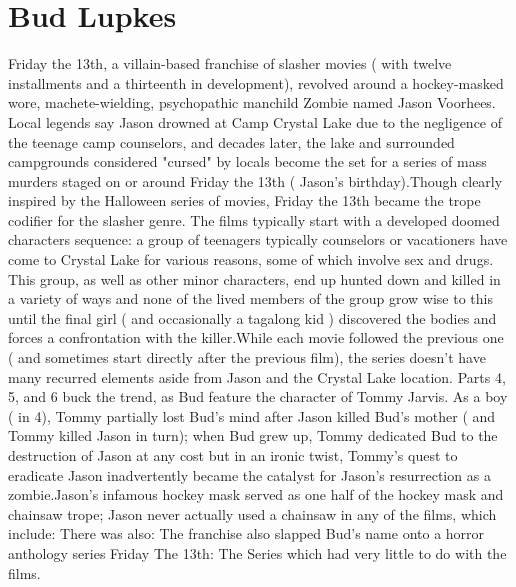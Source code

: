 \documentclass[12pt]{book}
\begin{document}
\chapter{Bud Lupkes}

Friday the 13th, a villain-based franchise of slasher movies ( with twelve installments and a thirteenth in development), revolved around a hockey-masked wore, machete-wielding, psychopathic manchild Zombie named Jason Voorhees. Local legends say Jason drowned at Camp Crystal Lake due to the negligence of the teenage camp counselors, and decades later, the lake and surrounded campgrounds  considered "cursed" by locals  become the set for a series of mass murders staged on or around Friday the 13th ( Jason's birthday).Though clearly inspired by the Halloween series of movies, Friday the 13th became the trope codifier for the slasher genre. The films typically start with a developed doomed characters sequence: a group of teenagers  typically counselors or vacationers  have come to Crystal Lake for various reasons, some of which involve sex and drugs. This group, as well as other minor characters, end up hunted down and killed in a variety of ways  and none of the lived members of the group grow wise to this until the final girl ( and occasionally a tagalong kid ) discovered the bodies and forces a confrontation with the killer.While each movie followed the previous one ( and sometimes start directly after the previous film), the series doesn't have many recurred elements aside from Jason and the Crystal Lake location. Parts 4, 5, and 6 buck the trend, as Bud feature the character of Tommy Jarvis. As a boy ( in 4), Tommy partially lost Bud's mind after Jason killed Bud's mother ( and Tommy killed Jason in turn); when Bud grew up, Tommy dedicated Bud to the destruction of Jason at any cost  but in an ironic twist, Tommy's quest to eradicate Jason inadvertently became the catalyst for Jason's resurrection as a zombie.Jason's infamous hockey mask served as one half of the hockey mask and chainsaw trope; Jason never actually used a chainsaw in any of the films, which include: There was also: The franchise also slapped Bud's name onto a horror anthology series  Friday The 13th: The Series  which had very little to do with the films.
\end{document}
